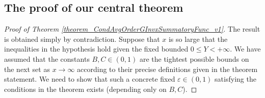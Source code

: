\documentclass[11pt,reqno,a4letter]{article}
\numberwithin{figure}{section}
\numberwithin{table}{section}
\theoremstyle{plain}
\numberwithin{theorem}{section}
\theoremstyle{definition}
\begin{document}
\subsection{The proof of our central theorem} 

\begin{proof}[Proof of Theorem \ref{theorem_CondAvgOrderGInvxSummatoryFunc_v1}] 
\label{proofOf_theorem_CondAvgOrderGInvxSummatoryFunc_v1} 
The result is obtained simply by contradiction. Suppose that $x$ is so large that the inequalities in the 
hypothesis hold given the fixed bounded $0 \leq Y < +\infty$. 
We have assumed that the constants $B,C \in (0, 1)$ are the tightest possible bounds on the next set as 
$x \rightarrow \infty$ according to their precise definitions given in the theorem statement. 
We need to show that such a 
concrete fixed $\varepsilon \in (0, 1)$ 
satisfying the conditions in the theorem exists (depending only on $B,C$). 


\end{proof}
\end{document}
